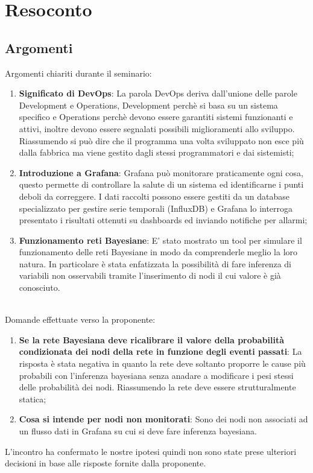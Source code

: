 \documentclass{article}
\begin{document}
\section{Resoconto}
    \subsection{Argomenti}
    Argomenti chiariti durante il seminario:
    \begin{enumerate}
        \item \textbf{Significato di DevOps}: La parola DevOps deriva dall'unione delle parole Development e Operations, Development perchè si basa su un sistema specifico e Operations perchè devono essere garantiti sistemi funzionanti e attivi, inoltre devono essere segnalati possibili miglioramenti allo sviluppo. Riassumendo si può dire che il programma una volta sviluppato non esce più dalla fabbrica ma viene gestito dagli stessi programmatori e dai sistemisti;
        \item \textbf{Introduzione a Grafana}: Grafana può monitorare praticamente ogni cosa, questo permette di controllare la salute di un sistema ed identificarne i punti deboli da correggere. I dati raccolti possono essere gestiti da un database specializzato per gestire serie temporali (InfluxDB) e Grafana lo interroga presentato i risultati ottenuti su dashboards ed inviando notifiche per allarmi;
        \item \textbf{Funzionamento reti Bayesiane}: E' stato mostrato un tool per simulare il funzionamento delle reti Bayesiane in modo da comprenderle meglio la loro natura. In particolare è stata enfatizzata la possibilità di fare inferenza di variabili non osservabili tramite l'inserimento di nodi il cui valore è già conosciuto.
    \end{enumerate}
    \\
    Domande effettuate verso la proponente:
    \begin{enumerate}
        \item \textbf{Se la rete Bayesiana deve ricalibrare il valore della probabilità condizionata dei nodi della rete in funzione degli eventi passati}: La risposta è stata negativa in quanto la rete deve soltanto proporre le cause più probabili con l'inferenza bayesiana senza anadare a modificare i pesi stessi delle probabilità dei nodi. Riassumendo la rete deve essere strutturalmente statica;
        \item \textbf{Cosa si intende per nodi non monitorati}: Sono dei nodi non associati ad un flusso dati in Grafana su cui si deve fare inferenza bayesiana.
    \end{enumerate}
    L'incontro ha confermato le nostre ipotesi quindi non sono state prese ulteriori decisioni in base alle risposte fornite dalla proponente.
    
\end{document}
